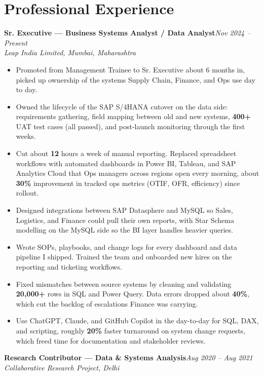 \documentclass[10pt, letterpaper]{article}
\newcommand{\role}[3]{%
  \vspace{2pt}%
  {\bfseries #1}\hfill{\small\color{muted}\textit{#3}}\\[-2pt]%
  {\small\color{muted}\textit{#2}}%
}
\begin{document}
\section{Professional Experience}

\role{Sr. Executive --- Business Systems Analyst / Data Analyst}{Leap India Limited, Mumbai, Maharashtra}{Nov 2024 -- Present}

\begin{itemize}
  \item Promoted from Management Trainee to Sr. Executive about 6 months in, picked up ownership of the systems Supply Chain, Finance, and Ops use day to day.
  \item Owned the lifecycle of the SAP S/4HANA cutover on the data side: requirements gathering, field mapping between old and new systems, \textbf{400+} UAT test cases (all passed), and post-launch monitoring through the first weeks.
  \item Cut about \textbf{12} hours a week of manual reporting. Replaced spreadsheet workflows with automated dashboards in Power BI, Tableau, and SAP Analytics Cloud that Ops managers across regions open every morning, about \textbf{30\%} improvement in tracked ops metrics (OTIF, OFR, efficiency) since rollout.
  \item Designed integrations between SAP Datasphere and MySQL so Sales, Logistics, and Finance could pull their own reports, with Star Schema modelling on the MySQL side so the BI layer handles heavier queries.
  \item Wrote SOPs, playbooks, and change logs for every dashboard and data pipeline I shipped. Trained the team and onboarded new hires on the reporting and ticketing workflows.
  \item Fixed mismatches between source systems by cleaning and validating \textbf{20,000+} rows in SQL and Power Query. Data errors dropped about \textbf{40\%}, which cut the backlog of escalations Finance was carrying.
  \item Use ChatGPT, Claude, and GitHub Copilot in the day-to-day for SQL, DAX, and scripting, roughly \textbf{20\%} faster turnaround on system change requests, which freed time for documentation and stakeholder reviews.
\end{itemize}

\vspace{1pt}

\role{Research Contributor --- Data \& Systems Analysis}{Collaborative Research Project, Delhi}{Aug 2020 -- Aug 2021}
\end{document}
